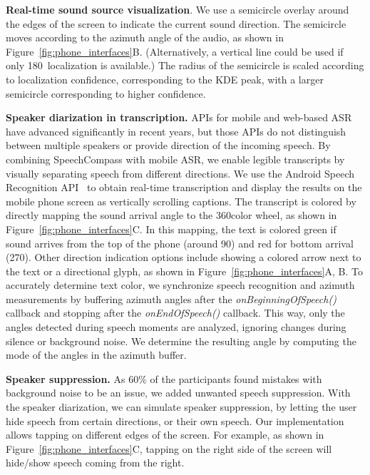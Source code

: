 \textbf{Real-time sound source visualization}. 
We use a semicircle overlay around the edges of the screen to indicate the current sound direction. The semicircle moves according to the azimuth angle of the audio, as shown in Figure~\ref{fig:phone_interfaces}B. (Alternatively, a vertical line could be used if only 180\textdegree~localization is available.) The radius of the semicircle is scaled according to localization confidence, corresponding to the KDE peak, with a larger semicircle corresponding to higher confidence. %


\textbf{Speaker diarization in transcription.}
APIs for mobile and web-based ASR have advanced significantly in recent years, but those APIs do not distinguish between multiple speakers or provide direction of the incoming speech. By combining SpeechCompass with mobile ASR, we enable legible transcripts by visually separating speech from different directions. 
We use the Android Speech Recognition API~\cite{AndroidSpeechRecognizer} to obtain real-time transcription and display the results on the mobile phone screen as vertically scrolling captions. The transcript is colored by directly mapping the sound arrival angle to the 360\textdegree color wheel, as shown in Figure~\ref{fig:phone_interfaces}C. In this mapping, the text is colored green if sound arrives from the top of the phone (around 90\textdegree) and red for bottom arrival (270\textdegree). Other direction indication options include showing a colored arrow next to the text or a directional glyph, as shown in Figure~\ref{fig:phone_interfaces}A, B. To accurately determine text color, we synchronize speech recognition and azimuth measurements by buffering azimuth angles after the \textit{onBeginningOfSpeech()} callback and stopping after the \textit{onEndOfSpeech()} callback. This way, only the angles detected during speech moments are analyzed, ignoring changes during silence or background noise. %
We determine the resulting angle by computing the mode of the angles in the azimuth buffer.

\textbf{Speaker suppression.} 
As 60\% of the participants found mistakes with background noise to be an issue, we added unwanted speech suppression. With the speaker diarization, we can simulate speaker suppression, by letting the user hide speech from certain directions, or their own speech. Our implementation allows tapping on different edges of the screen. For example, as shown in Figure~\ref{fig:phone_interfaces}C, tapping on the right side of the screen will hide/show speech coming from the right. 








